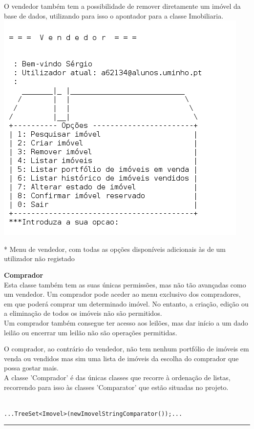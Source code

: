 \documentclass[12pt]{article}
\newenvironment{code}                    
{\textbf{
} \hspace{1cm} \hrulefill \\ 
\smallskip 
\begin{center}
\begin{minipage}{0.9\textwidth} 
\begin{alltt}\small}
{\end{alltt}
\end{minipage}
\end{center}
\hrule\smallskip
}
\begin{document}
O vendedor também tem a possibilidade de remover diretamente um imóvel da base de dados, utilizando para isso o apontador para a classe Imobiliaria.
~\\
\includegraphics[scale=0.5]{008.png}
\\
\begin{footnotesize}
* Menu de vendedor, com todas as opções disponíveis adicionais às de um utilizador não registado
\end{footnotesize}
\pagebreak

\textbf{Comprador}
~\\

Esta classe também tem as suas únicas permissões, mas não tão avançadas como um vendedor. Um comprador pode aceder ao menu exclusivo dos compradores, em que poderá comprar um determinado imóvel. No entanto, a criação, edição ou a eliminação de todos os imóveis não são permitidos.
\\

Um comprador também consegue ter acesso aos leilões, mas dar início a um dado leilão ou encerrar um leilão não são operações permitidas.

O comprador, ao contrário do vendedor, não tem nenhum portfólio de imóveis em venda ou vendidos mas sim uma lista de imóveis da escolha do comprador que possa gostar mais.
\\

A classe 'Comprador' é das únicas classes que recorre à ordenação de listas, recorrendo para isso às classes 'Comparator' que estão situadas no projeto.
~\\
\newline
\begin{code}
... TreeSet <Imovel> (new ImovelStringComparator ()); ...
\end{code}
~\\
\end{document}
